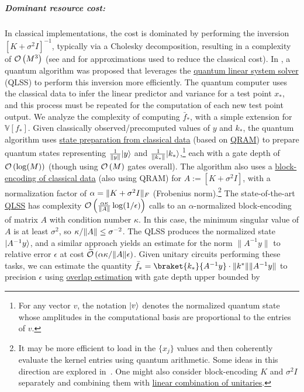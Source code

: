 \begin{refsection}
\subparagraph{Dominant resource cost:}
In classical implementations, the cost is dominated by performing the inversion $[K+ \sigma^2 I]^{-1}$, typically via a Cholesky decomposition, resulting in a complexity of $\mathcal{O}\left( M^3 \right)$ (see \cite[Chapter 8]{rasmussen2005GaussianProcessTextbook} and \cite{liu2020gaussian} for approximations used to reduce the classical cost). In \cite{zhao2015QAssisstedGaussProcRegr}, a quantum algorithm was proposed that leverages the \hyperref[prim:QuantumLinearSystemSolvers]{quantum linear system solver} (QLSS) to perform this inversion more efficiently. The quantum computer uses the classical data to infer the linear predictor and variance for a test point $x_*$, and this process must be repeated for the computation of each new test point output. We analyze the complexity of computing $\bar{f}_*$, with a simple extension for $\mathbb{V}[f_*]$. Given classically observed/precomputed values of $y$ and $k_*$, the quantum algorithm uses \hyperref[prim:StatePrepData]{state preparation from classical data} (based on \hyperref[prim:QRAM]{QRAM}) to prepare quantum states representing $\frac{1}{\lVert y\rVert} \lvert y\rangle$ and $\frac{1}{\lVert k_*\rVert} \lvert k_*\rangle$,\footnote{For any vector $v$, the notation $\lvert v\rangle$ denotes the normalized quantum state whose amplitudes in the computational basis are proportional to the entries of $v$.} each with a gate depth of $\mathcal{O}\left( \log(M) \right)$ (though using $\mathcal{O}\left( M \right)$ gates overall). The algorithm also uses a \hyperref[prim:BlockEncodingsClassical]{block-encoding of classical data} (also using QRAM) for $A:=[K + \sigma^2 I]$, with a normalization factor of $\alpha = \lVert K + \sigma^2 I\rVert_F$ (Frobenius norm).\footnote{It may be more efficient to load in the $\{x_j\}$ values and then coherently evaluate the kernel entries using quantum arithmetic. Some ideas in this direction are explored in~\cite{chen2022GaussianProcessQuantum}. One might also consider block-encoding $K$ and $\sigma^2 I$ separately and combining them with \hyperref[prim:LCU]{linear combination of unitaries}.} The state-of-the-art \hyperref[prim:QuantumLinearSystemSolvers]{QLSS} has complexity $\mathcal{O}\left( \frac{\alpha \kappa}{\lVert A\rVert} \log(1/\epsilon) \right)$ calls to an $\alpha$-normalized block-encoding of matrix $A$ with condition number $\kappa$. In this case, the minimum singular value of $A$ is at least $\sigma^2$, so $\kappa/\lVert A\rVert\leq \sigma^{-2}$. The QLSS produces the normalized state $\lvert A^{-1}y\rangle$, and a similar approach yields an estimate for the norm $\lVert A^{-1}y \rVert$ to relative error $\epsilon$ at cost $\widetilde{\mathcal{O}}\left( \alpha \kappa/\lVert A\rVert\epsilon \right)$. Given unitary circuits performing these tasks, we can estimate the quantity $\bar{f}_* = \braket{k_*}{A^{-1}y} \cdot \nrm{k^*}\nrm{A^{-1}y}$ to precision $\epsilon$ using \hyperref[prim:AmpEst]{overlap estimation} with gate depth upper bounded by

\end{refsection}
